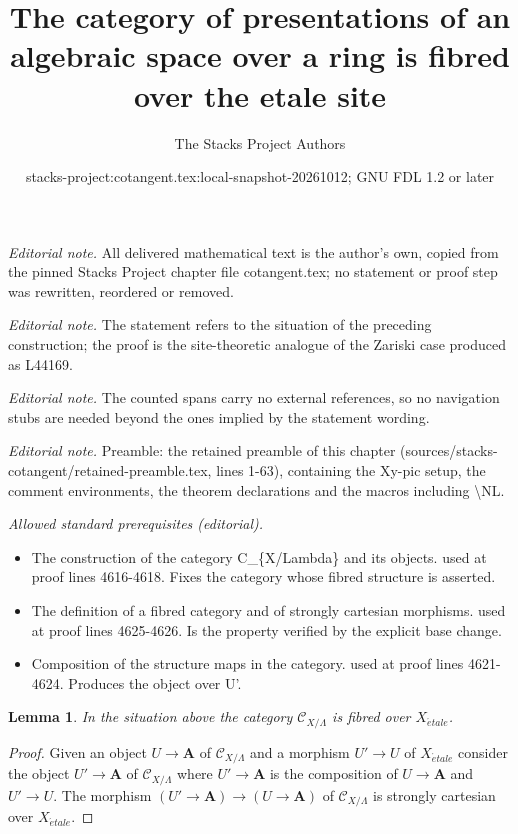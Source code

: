 \documentclass[10pt,a4paper]{amsart}
\title{The category of presentations of an algebraic space over a ring is fibred over the etale site}
\author{The Stacks Project Authors}
\date{stacks-project:cotangent.tex:local-snapshot-20261012; GNU FDL 1.2 or later}
\theoremstyle{plain}
\newtheorem{lemma}[subsection]{Lemma}
\theoremstyle{definition}
\theoremstyle{remark}
\numberwithin{equation}{subsection}
\def\etale{{\acute{e}tale}}
\begin{document}
\maketitle
\setcounter{subsection}{1}
\noindent\textit{Editorial note.} All delivered mathematical text is the author's own, copied from the pinned Stacks Project chapter file cotangent.tex; no statement or proof step was rewritten, reordered or removed.\par\medskip
\noindent\textit{Editorial note.} The statement refers to the situation of the preceding construction; the proof is the site-theoretic analogue of the Zariski case produced as L44169.\par\medskip
\noindent\textit{Editorial note.} The counted spans carry no external references, so no navigation stubs are needed beyond the ones implied by the statement wording.\par\medskip
\noindent\textit{Editorial note.} Preamble: the retained preamble of this chapter (sources/stacks-cotangent/retained-preamble.tex, lines 1-63), containing the Xy-pic setup, the comment environments, the theorem declarations and the macros including \textbackslash{}NL.\par\medskip
\noindent\textit{Allowed standard prerequisites (editorial).}\begin{itemize}
\item The construction of the category C\_\{X/Lambda\} and its objects. used at proof lines 4616-4618. Fixes the category whose fibred structure is asserted.
\item The definition of a fibred category and of strongly cartesian morphisms. used at proof lines 4625-4626. Is the property verified by the explicit base change.
\item Composition of the structure maps in the category. used at proof lines 4621-4624. Produces the object over U'.
\end{itemize}\medskip
\begin{lemma}
\label{lemma-category-fibred-space}
In the situation above the category
$\mathcal{C}_{X/\Lambda}$ is fibred over $X_\etale$.
\end{lemma}

\begin{proof}
Given an object $U \to \mathbf{A}$ of $\mathcal{C}_{X/\Lambda}$ and a morphism
$U' \to U$ of $X_\etale$ consider the object $U' \to \mathbf{A}$ of
$\mathcal{C}_{X/\Lambda}$ where $U' \to \mathbf{A}$ is the composition of
$U \to \mathbf{A}$
and $U' \to U$. The morphism $(U' \to \mathbf{A}) \to (U \to \mathbf{A})$ of
$\mathcal{C}_{X/\Lambda}$ is strongly cartesian over $X_\etale$.
\end{proof}
\end{document}
